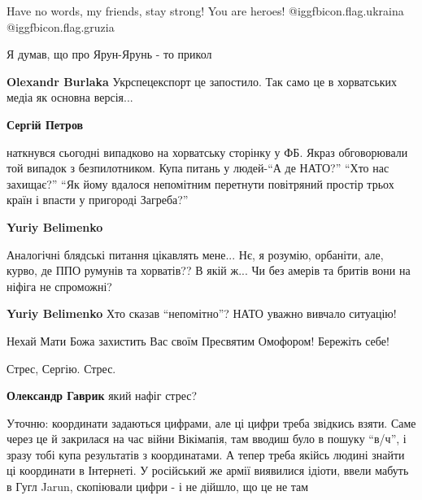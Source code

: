  
 
 
 
 
\zzSecCmt

\begin{itemize} %
Have no words, my friends, stay strong! You are heroes! @igg{fbicon.flag.ukraina}  @igg{fbicon.flag.gruzia}

Я думав, що про Ярун-Ярунь - то прикол

\begin{itemize} %
\textbf{Olexandr Burlaka} Укрспецекспорт це запостило. Так само це в хорватських медіа як основна версія...

\textbf{Сергій Петров} 

наткнувся сьогодні випадково на хорватську сторінку у ФБ. Якраз обговорювали
той випадок з безпилотником. Купа питань у людей-\enquote{А де НАТО?} \enquote{Хто нас
захищає?} \enquote{Як йому вдалося непомітним перетнути повітряний простір трьох країн
і впасти у пригороді Загреба?}

\textbf{Yuriy Belimenko} 

Аналогічні блядські питання цікавлять мене... Нє, я розумію, орбаніти, але,
курво, де ППО румунів та хорватів?? В якій ж... Чи без амерів та бритів вони на
ніфіга не спроможні?

\textbf{Yuriy Belimenko} Хто сказав \enquote{непомітно}? НАТО уважно вивчало ситуацію!
\end{itemize} %


Нехай Мати Божа захистить Вас своїм Пресвятим Омофором! Бережіть себе!

Стрес, Сергію. Стрес.

\textbf{Олександр Гаврик} який нафіг стрес?


Уточню: координати задаються цифрами, але ці цифри треба звідкись взяти. Саме
через це й закрилася на час війни Вікімапія, там вводиш було в пошуку \enquote{в/ч}, і
зразу тобі купа результатів з координатами. А тепер треба якійсь людині знайти
ці координати в Інтернеті. У російський же армії виявилися ідіоти, ввели мабуть
в Гугл Jarun, скопіювали цифри - і не дійшло, що це не там


\end{itemize}
